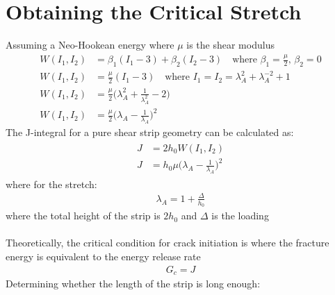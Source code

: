 \documentclass[12pt,3p]{article}
\numberwithin{equation}{section}
\begin{document}
\section{Obtaining the Critical Stretch}
Assuming a Neo-Hookean energy where $\mu$ is the shear modulus 
\begin{align*}
W(I_1, I_2) &= \beta_1 (I_1 - 3) + \beta_2 (I_2 - 3) \quad \text{where } \beta_1 = \frac{\mu}{2}, \, \beta_2 = 0 \\
W(I_1, I_2) &= \frac{\mu}{2} (I_1 - 3) \quad \text{where } I_1 = I_2 = \lambda_A^2 + \lambda_A^{-2} + 1 \\
W(I_1, I_2) &= \frac{\mu}{2} \bigg( \lambda_A^2 + \frac{1}{\lambda_A^2} - 2 \bigg) \\
W(I_1, I_2) &= \frac{\mu}{2} \bigg( \lambda_A - \frac{1}{\lambda_A} \bigg)^2
\end{align*}
The J-integral for a pure shear strip geometry can be calculated as:
\begin{align}\label{EqJAnalytical}
\begin{split}
J &= 2 h_0 W(I_1, I_2) \\
J &= h_0 \mu \bigg( \lambda_A - \frac{1}{\lambda_A} \bigg)^2
\end{split}
\end{align}
where for the stretch:
\begin{align}\label{EqStretch}
\lambda_A = 1 + \frac{\Delta}{h_0}
\end{align}
where the total height of the strip is $2h_0$ and $\Delta$ is the loading \\ \\
Theoretically, the critical condition for crack initiation is where the fracture energy is equivalent to the energy release rate  
\begin{align*}
G_c = J 
\end{align*}
Determining whether the length of the strip is long enough:
\end{document}
